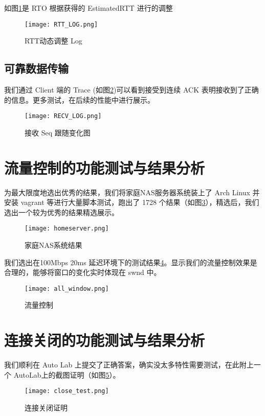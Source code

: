 如图\ref{fig:RTTLOG}是 RTO 根据获得的 EstimatedRTT 进行的调整
\begin{figure}[!htbp]
    \centering
    \texttt{[image: RTT\_LOG.png]}
    \caption{RTT动态调整 Log}\label{fig:RTTLOG}
\end{figure}

\subsection{可靠数据传输}

我们通过 Client 端的 Trace (如图\ref{fig:recvLog})可以看到接受到连续 ACK 表明接收到了正确的信息。更多测试，在后续的性能中进行展示。

\begin{figure}[!htbp]
    \centering
    \texttt{[image: RECV\_LOG.png]}
    \caption{接收 Seq 跟随变化图}\label{fig:recvLog}
\end{figure}

\section{流量控制的功能测试与结果分析}


为最大限度地选出优秀的结果，我们将家庭NAS服务器系统装上了 Arch Linux 并安装 vagrant 等进行大量脚本测试，跑出了 1728 个结果（如图\ref{fig:results_all}），精选后，我们选出一个较为优秀的结果精选展示。

\begin{figure}[!htbp]
    \centering
    \texttt{[image: homeserver.png]}
    \caption{家庭NAS系统结果}\label{fig:results_all}
\end{figure}


我们选出在100Mbps 20ms 延迟环境下的测试结果\ref{fig:all_window}。显示我们的流量控制效果是合理的，能够将窗口的变化实时体现在 swnd 中。
\begin{figure}[!htbp]
    \centering
    \texttt{[image: all\_window.png]}
    \caption{流量控制}\label{fig:all_window}
\end{figure}

\section{连接关闭的功能测试与结果分析}
我们顺利在 Auto Lab 上提交了正确答案，确实没太多特性需要测试，在此附上一个 AutoLab上的截图证明（如图\ref{fig:close_test}）。

\begin{figure}[!htbp]
    \centering
    \texttt{[image: close\_test.png]}
    \caption{连接关闭证明}\label{fig:close_test}
\end{figure}


